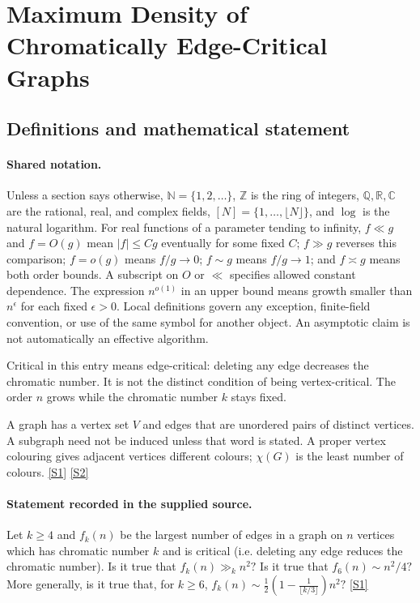 \documentclass[11pt,a4paper]{article}
\newcommand{\N}{\mathbb{N}}
\newcommand{\Z}{\mathbb{Z}}
\newcommand{\Q}{\mathbb{Q}}
\newcommand{\R}{\mathbb{R}}
\newcommand{\C}{\mathbb{C}}
\newcommand{\sref}[2]{\hyperlink{source:#1:#2}{[S#2]}}
\begin{document}
\section{Maximum Density of Chromatically Edge-Critical Graphs}\label{statement}


\subsection{Definitions and mathematical statement}

\paragraph{Shared notation.}Unless a section says otherwise, $\N=\{1,2,\ldots\}$,
$\Z$ is the ring of integers, $\Q,\R,\C$ are the rational, real, and complex
fields, $[N]=\{1,\ldots,\lfloor N\rfloor\}$, and $\log$ is the natural
logarithm. For real functions of a parameter tending to infinity,
$f\ll g$ and $f=O(g)$ mean $|f|\leq Cg$ eventually for some fixed $C$;
$f\gg g$ reverses this comparison; $f=o(g)$ means $f/g\to0$;
$f\sim g$ means $f/g\to1$; and $f\asymp g$ means both order bounds.
A subscript on $O$ or $\ll$ specifies allowed constant dependence.
The expression $n^{o(1)}$ in an upper bound means growth smaller than
$n^\epsilon$ for each fixed $\epsilon>0$. Local definitions govern any
exception, finite-field convention, or use of the same symbol for another
object. An asymptotic claim is not automatically an effective algorithm.



Critical in this entry means edge-critical: deleting any edge decreases the chromatic number. It is not the distinct condition of being vertex-critical. The order $n$ grows while the chromatic number $k$ stays fixed.

A graph has a vertex set $V$ and edges that are unordered pairs of distinct vertices. A subgraph need not be induced unless that word is stated. A proper vertex colouring gives adjacent vertices different colours; $\chi(G)$ is the least number of colours. \sref{statement}{1} \sref{statement}{2}

\paragraph{Statement recorded in the supplied source.}
Let $k\geq 4$ and $f_k(n)$ be the largest number of edges in a graph on $n$ vertices which has chromatic number $k$ and is critical (i.e. deleting any edge reduces the chromatic number).
Is it true that $ f_k(n) \gg_k n^2? $ Is it true that $ f_6(n)\sim n^2/4? $ More generally, is it true that, for $k\geq 6$, $ f_k(n) \sim \frac{1}{2}\left(1-\frac{1}{\lfloor k/3\rfloor}\right)n^2? $ \sref{statement}{1}
\end{document}
